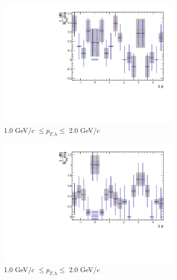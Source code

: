 \begin{figure}[htbp]
\begin{subfigure}{0.5\textwidth}
		\includegraphics[width=\textwidth]{Plots/Correlations/subtracted/NPE_eh_corr_subtracted_primpt_4_5_cent_7_8_assopt_2_2.pdf}
		\caption{1.0 GeV/c $\leq p_{T,h} \leq$ 2.0 GeV/c}
		\label{fig:Sub010c}
	\end{subfigure}	
	\begin{subfigure}{0.5\textwidth}
		\includegraphics[width=\textwidth]{Plots/Correlations/subtracted/NPE_eh_corr_subtracted_primpt_6_8_cent_7_8_assopt_2_2.pdf}
		\caption{1.0 GeV/c $\leq p_{T,h} \leq$ 2.0 GeV/c}
		\label{fig:Sub010d}
	\end{subfigure}	
	\begin{subfigure}{0.5\textwidth}

\end{subfigure}
\end{figure}
